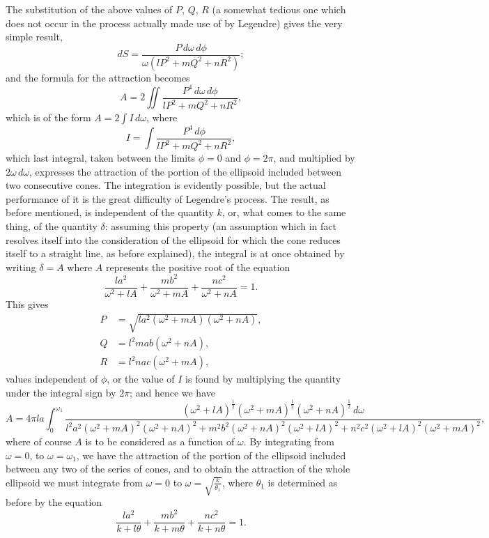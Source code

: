 \documentclass[11pt,a4paper]{book}
\begin{document}
The substitution of the above values of $P$, $Q$, $R$ (a somewhat tedious one which does not occur in the process actually made use of by Legendre) gives the very simple result,
\[
dS = \frac{P\, d\omega\, d\phi}{\omega(lP^{2} + mQ^{2} + nR^{2})};
\]
and the formula for the attraction becomes
\[
A = 2\iint \frac{P^{4}\, d\omega\, d\phi}{lP^{2} + mQ^{2} + nR^{2}},
\]
which is of the form $A = 2\int I\, d\omega$, where
\[
I = \int \frac{P^{4}\, d\phi}{lP^{2} + mQ^{2} + nR^{2}},
\]
which last integral, taken between the limits $\phi = 0$ and $\phi = 2\pi$, and multiplied by $2\omega\, d\omega$, expresses the attraction of the portion of the ellipsoid included between two consecutive cones. The integration is evidently possible, but the actual performance of it is the great difficulty of Legendre's process. The result, as before mentioned, is independent of the quantity $k$, or, what comes to the same thing, of the quantity $\delta$: assuming this property (an assumption which in fact resolves itself into the consideration of the ellipsoid for which the cone reduces itself to a straight line, as before explained), the integral is at once obtained by writing $\delta = A$ where $A$ represents the positive root of the equation
\[
\frac{la^{2}}{\omega^{2} + lA} + \frac{mb^{2}}{\omega^{2} + mA} + \frac{nc^{2}}{\omega^{2} + nA} = 1.
\]
This gives
\begin{align*}
P &= \sqrt{la^{2}(\omega^{2} + mA)(\omega^{2} + nA)}, \\
Q &= l^{2}mab(\omega^{2} + nA), \\
R &= l^{2}nac(\omega^{2} + mA),
\end{align*}
values independent of $\phi$, or the value of $I$ is found by multiplying the quantity under the integral sign by $2\pi$; and hence we have
\[
A = 4\pi la \int_{0}^{\omega_{1}} \frac{(\omega^{2} + lA)^{\frac{1}{2}}(\omega^{2} + mA)^{\frac{1}{2}}(\omega^{2} + nA)^{\frac{1}{2}}\, d\omega}{l^{2}a^{2}(\omega^{2} + mA)^{2}(\omega^{2} + nA)^{2} + m^{2}b^{2}(\omega^{2} + nA)^{2}(\omega^{2} + lA)^{2} + n^{2}c^{2}(\omega^{2} + lA)^{2}(\omega^{2} + mA)^{2}},
\]
where of course $A$ is to be considered as a function of $\omega$. By integrating from $\omega = 0$, to $\omega = \omega_{1}$, we have the attraction of the portion of the ellipsoid included between any two of the series of cones, and to obtain the attraction of the whole ellipsoid we must integrate from $\omega = 0$ to $\omega = \sqrt{\frac{k}{\theta_{1}}}$, where $\theta_{1}$ is determined as before by the equation
\[
\frac{la^{2}}{k + l\theta} + \frac{mb^{2}}{k + m\theta} + \frac{nc^{2}}{k + n\theta} = 1.
\]
\end{document}
